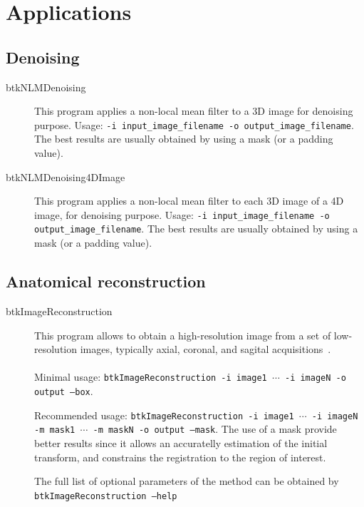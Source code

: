 \section{Applications}

\subsection{Denoising}

\begin{description}
 \item[btkNLMDenoising] This program applies a non-local mean filter to a 3D image for denoising purpose. Usage: \texttt{-i input\_image\_filename -o output\_image\_filename}. The best results are usually obtained by using a mask (or a padding value).
\end{description}

\begin{description}
 \item[btkNLMDenoising4DImage] This program applies a non-local mean filter to each 3D image of a 4D image, for denoising purpose. Usage: \texttt{-i input\_image\_filename -o output\_image\_filename}. The best results are usually obtained by using a mask (or a padding value).
\end{description}


\subsection{Anatomical reconstruction}
\label{subsec:ana_rec}
\begin{description}
 \item[btkImageReconstruction] This program allows to obtain a
high-resolution image from a set of low-resolution images, typically
axial, coronal, and sagital acquisitions~\cite{Rousseau2006}. \\\\
Minimal usage: \texttt{btkImageReconstruction -i image1 $\cdots$ -i imageN -o
output --box}. 

Recommended usage: \texttt{btkImageReconstruction -i image1 $\cdots$ -i imageN
-m mask1 $\cdots$ -m maskN -o output --mask}. The use of a mask provide
better results since it allows an accuratelly estimation of the initial
transform, and constrains the registration to the region of interest.

The full list of optional parameters of the method can be obtained by
\texttt{btkImageReconstruction --help}

\end{description}

